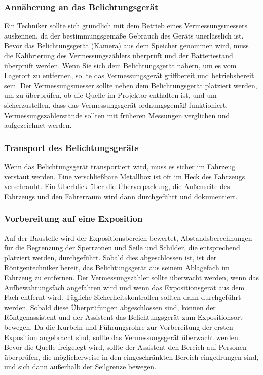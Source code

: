 {\subsubsection{Annäherung an das Belichtungsgerät}
Ein Techniker sollte sich gründlich mit dem Betrieb eines Vermessungsmessers auskennen, da der bestimmungsgemäße Gebrauch des Geräts unerlässlich ist. Bevor das Belichtungsgerät (Kamera) aus dem Speicher genommen wird, muss die Kalibrierung des Vermessungszählers überprüft und der Batteriestand überprüft werden. Wenn Sie sich dem Belichtungsgerät nähern, um es vom Lagerort zu entfernen, sollte das Vermessungsgerät griffbereit und betriebsbereit sein. Der Vermessungsmesser sollte neben dem Belichtungsgerät platziert werden, um zu überprüfen, ob die Quelle im Projektor enthalten ist, und um sicherzustellen, dass das Vermessungsgerät ordnungsgemäß funktioniert. Vermessungszählerstände sollten mit früheren Messungen verglichen und aufgezeichnet werden.
\subsubsection{Transport des Belichtungsgeräts}
Wenn das Belichtungsgerät transportiert wird, muss es sicher im Fahrzeug verstaut werden. Eine verschließbare Metallbox ist oft im Heck des Fahrzeugs verschraubt. Ein Überblick über die Überverpackung, die Außenseite des Fahrzeugs und den Fahrerraum wird dann durchgeführt und dokumentiert.
\subsubsection{Vorbereitung auf eine Exposition}
Auf der Baustelle wird der Expositionsbereich bewertet, Abstandsberechnungen für die Begrenzung der Sperrzonen und Seile und Schilder, die entsprechend platziert werden, durchgeführt. Sobald dies abgeschlossen ist, ist der Röntgentechniker bereit, das Belichtungsgerät aus seinem Ablagefach im Fahrzeug zu entfernen. Der Vermessungszähler sollte überwacht werden, wenn das Aufbewahrungsfach angefahren wird und wenn das Expositionsgerät aus dem Fach entfernt wird. Tägliche Sicherheitskontrollen sollten dann durchgeführt werden. Sobald diese Überprüfungen abgeschlossen sind, können der Röntgenassistent und der Assistent das Belichtungsgerät zum Expositionsort bewegen. Da die Kurbeln und Führungsrohre zur Vorbereitung der ersten Exposition angebracht sind, sollte das Vermessungsgerät überwacht werden. Bevor die Quelle freigelegt wird, sollte der Assistent den Bereich auf Personen überprüfen, die möglicherweise in den eingeschränkten Bereich eingedrungen sind, und sich dann außerhalb der Seilgrenze bewegen.
}
